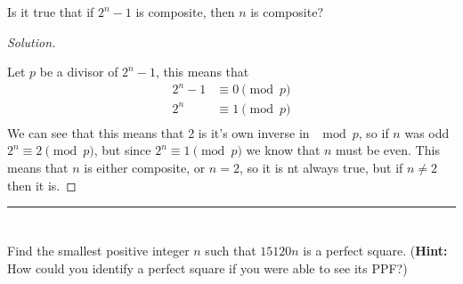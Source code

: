 \documentclass[11pt]{article}
\newcommand{\bline}{\noindent\rule[0.5ex]{\linewidth}{1pt}}
\newenvironment{problem}[2][Problem]{\begin{trivlist}
\item[\hskip \labelsep {\bfseries #1}\hskip \labelsep {\bfseries #2.}]}{\end{trivlist}}
\newenvironment{solution}
  {\renewcommand\qedsymbol{$~$}\begin{proof}[Solution]$ $\par\nobreak\ignorespaces}
  {\end{proof}}
\begin{document}
\begin{problem}{15}
Is it true that if $2^n-1$ is composite, then $n$ is composite?
\end{problem}

\begin{solution}
    Let $p$ be a divisor of $2^n-1$, this means that
    \begin{align*}
        2^n-1 & \equiv 0 \pmod{p} \\
        2^n   & \equiv 1 \pmod{p} \\
    \end{align*}
    We can see that this means that 2 is it's own inverse in $\mod{p}$, so if $n$ was odd $2^n\equiv 2\pmod{p}$, but since $2^n\equiv 1 \pmod{p}$ we know that $n$ must be even. This means that $n$ is either composite, or $n=2$, so it is nt always true, but if $n\neq 2$ then it is.
\end{solution}

\bline

\section{}
\begin{problem}{}
Find the smallest positive integer $n$ such that $15120 n$ is a perfect square. (\textbf{Hint:} How could you identify a perfect square if you were able to see its PPF?)
\end{problem}
\end{document}
